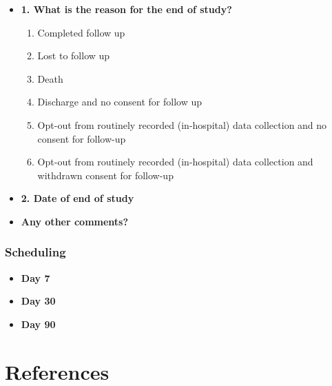 \documentclass[
]{scrartcl}
\providecommand{\tightlist}{%
  \setlength{\itemsep}{0pt}\setlength{\parskip}{0pt}}\usepackage{longtable,booktabs,array}
\begin{document}
\begin{itemize}
\item
  \textbf{1. What is the reason for the end of study?}

  \begin{enumerate}
  \def\labelenumi{\arabic{enumi}.}
  \tightlist
  \item
    Completed follow up
  \item
    Lost to follow up
  \item
    Death
  \item
    Discharge and no consent for follow up
  \item
    Opt-out from routinely recorded (in-hospital) data collection and no
    consent for follow-up
  \item
    Opt-out from routinely recorded (in-hospital) data collection and
    withdrawn consent for follow-up
  \end{enumerate}
\item
  \textbf{2. Date of end of study}
\item
  \textbf{Any other comments?}
\end{itemize}

\hypertarget{scheduling}{%
\subsubsection{Scheduling}\label{scheduling}}

\begin{itemize}
\item
  \textbf{Day 7}
\item
  \textbf{Day 30}
\item
  \textbf{Day 90}
\end{itemize}

\hypertarget{references}{%
\section{References}\label{references}}
\end{document}
